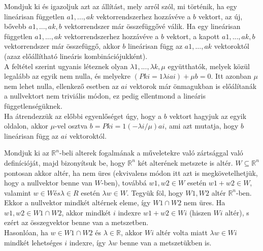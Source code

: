 \begin{frame}
  \begin{tcolorbox}[title={3. (4p)}]
      Mondjuk ki és igazoljuk azt az állítást, mely arról szól, mi történik, ha egy lineárisan független $a1,...,ak$ vektorrendszerhez hozzávéve a $b$ vektort, az új, bővebb $a1,...,ak,b$ vektorrendszer már összefüggővé válik.
  \tcblower
    Ha egy lineárisan független $a1,...,ak$ vektorrendszerhez hozzávéve a $b$ vektort, a kapott $a1,...,ak,b$ vektorrendszer már összefüggő, akkor $b$ lineárisan függ az $a1,...,ak$ vektoroktól (azaz előállítható lineáris kombinációjukként).\\
    
    A feltétel szerint ugyanis léteznek olyan ${\lambda}1,...,{\lambda}k,{\mu}$ együtthatók, melyek közül legalább az egyik nem nulla, és melyekre $(Pk i=1 {\lambda}iai) + {\mu}b = 0$. Itt azonban ${\mu}$ nem lehet nulla, ellenkező esetben az $ai$ vektorok már önmagukban is előálítanák a nullvektort nem triviális módon, ez pedig ellentmond a lineáris függetlenségüknek.\\
    
    Ha átrendezzük az előbbi egyenlőséget úgy, hogy a $b$ vektort hagyjuk az egyik oldalon, akkor ${\mu}$-vel osztva $b = Pk i=1(-{\lambda}i/{\mu})ai$, ami azt mutatja, hogy $b$ lineárisan függ az $ai$ vektoroktól.
  \end{tcolorbox}
\end{frame}

\begin{frame}
  \begin{tcolorbox}[title={4. (4p)}]
      Mondjuk ki az $\mathbb{R}^n$-beli alterek fogalmának a műveletekre való zártsággal való definícióját, majd bizonyítsuk be, hogy $\mathbb{R}^n$ két alterének metszete is altér.
  \tcblower
    $W {\subseteq} \mathbb{R}^n$ pontosan akkor altér, ha nem üres (ekvivalens módon itt azt is megkövetelhetjük, hogy a nullvektor benne van $W$-ben), továbbá $w1,w2 \in W$ esetén $w1 +w2 \in W$, valamint $w \in W és {\lambda} \in R$ esetén ${\lambda}w \in W$. Tegyük föl, hogy $W1,W2$ altér $\mathbb{R}^n$-ben.\\
    
    Ekkor a nullvektor mindkét altérnek eleme, így $W1 {\cap}W2$ nem üres. Ha $w1,w2 \in W1 {\cap}W2$, akkor mindkét $i$ indexre $w1 +w2 \in Wi$ (hiszen $Wi$ altér), s ezért az összegvektor benne van a metszetben.\\
    
    Hasonlóan, ha $w \in W1 {\cap} W2$ és ${\lambda} \in \mathbb{R}$, akkor $Wi$ altér volta miatt ${\lambda}w \in Wi$ mindkét lehetséges $i$ indexre, így ${\lambda}w$ benne van a metszetükben is.
  \end{tcolorbox}
\end{frame}


